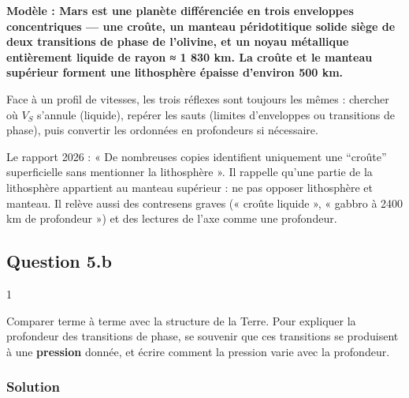 \documentclass[11pt,a4paper]{article}
\begin{document}
\textbf{Modèle : Mars est une planète différenciée en trois enveloppes concentriques --- une croûte, un manteau péridotitique solide siège de deux transitions de phase de l'olivine, et un noyau métallique entièrement liquide de rayon ≈ 1 830 km. La croûte et le manteau supérieur forment une lithosphère épaisse d'environ 500 km.}

\begin{methode}

Face à un profil de vitesses, les trois réflexes sont toujours les mêmes : chercher où \(V_S\) s'annule (liquide), repérer les sauts (limites d'enveloppes ou transitions de phase), puis convertir les ordonnées en profondeurs si nécessaire.

\end{methode}

\begin{jury}

Le rapport 2026 : « De nombreuses copies identifient uniquement une ``croûte'' superficielle sans mentionner la lithosphère ». Il rappelle qu'une partie de la lithosphère appartient au manteau supérieur : ne pas opposer lithosphère et manteau. Il relève aussi des contresens graves (« croûte liquide », « gabbro à 2400 km de profondeur ») et des lectures de l'axe comme une profondeur.

\end{jury}

\hypertarget{question-5.b}{%
\subsection{Question 5.b}\label{question-5.b}}

\begin{indication}{1}

Comparer terme à terme avec la structure de la Terre. Pour expliquer la profondeur des transitions de phase, se souvenir que ces transitions se produisent à une \textbf{pression} donnée, et écrire comment la pression varie avec la profondeur.

\end{indication}

\hypertarget{solution-15}{%
\subsubsection{Solution}\label{solution-15}}
\end{document}
